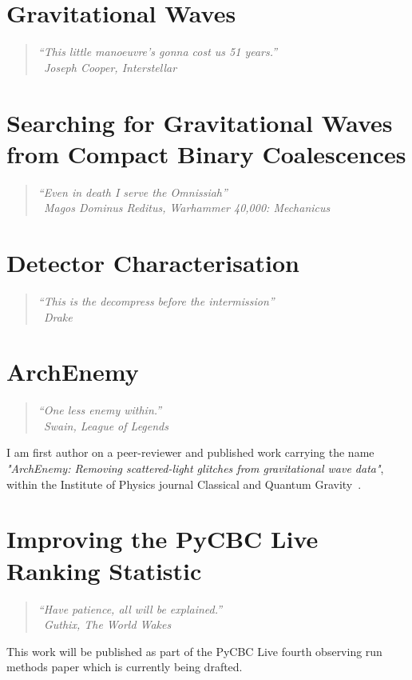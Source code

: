 \documentclass[12pt,twoside]{report} %
\makeatletter
\newcommand{\chapterquote}[2]{
  \begin{quote}
    \color{mediumgray}\itshape #1 \\[1ex] %
    \raggedleft %
    \textemdash\ #2
  \end{quote}
}
\renewcommand{\cleardoublepage}{%
  \clearpage%
  \if@twoside
    \ifodd\c@page
    \else
      \hbox{}%
      \thispagestyle{empty}%
      \newpage
    \fi
  \fi
}
\let\oldchapter\chapter
\renewcommand{\chapter}{\cleardoublepage\oldchapter}
\makeatother
\begin{document}
\chapter[Gravitational Waves]{\label{chapter:1-gravitational-waves}Gravitational Waves}
\chapterquote{``This little manoeuvre's gonna cost us 51 years.''}{Joseph Cooper, Interstellar}


\chapter[Searching for Gravitational-Waves from Compact Binary Coalescences]{\label{chapter:2-searches}Searching for Gravitational Waves from Compact Binary Coalescences}
\chapterquote{``Even in death I serve the Omnissiah''}{Magos Dominus Reditus, Warhammer 40,000: Mechanicus}


\chapter[Detector Characterisation]{\label{chapter:3-detchar}Detector Characterisation}
\chapterquote{``This is the decompress before the intermission''}{Drake}


\chapter[ArchEnemy]{\label{chapter:4-archenemy}ArchEnemy}
\chapterquote{``One less enemy within.''}{Swain, League of Legends}
I am first author on a peer-reviewer and published work carrying the name \textit{"ArchEnemy: Removing scattered-light glitches from gravitational wave data"}, within the Institute of Physics journal Classical and Quantum Gravity~\cite{ArchEnemy:2023}.


\chapter[Improving the PyCBC Live Ranking Statistic]{\label{chapter:5-pycbc-live}Improving the PyCBC Live Ranking Statistic}
\chapterquote{``Have patience, all will be explained.''}{Guthix, The World Wakes}
This work will be published as part of the PyCBC Live fourth observing run methods paper which is currently being drafted.
\end{document}
